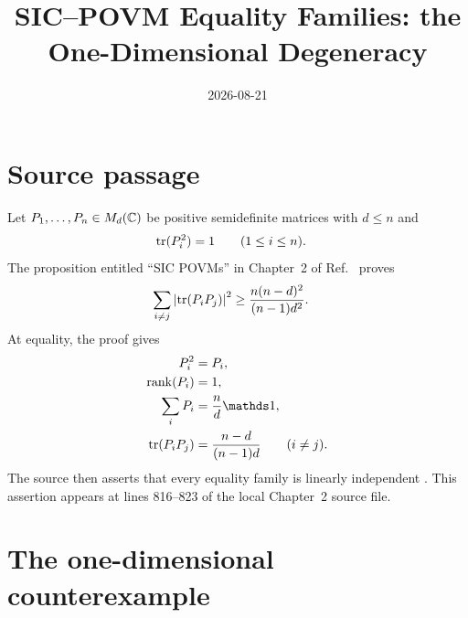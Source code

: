 \documentclass{article}
\title{SIC--POVM Equality Families: the One-Dimensional Degeneracy}
\author{}
\date{2026-08-21}
\begin{document}
\maketitle
{}

\section{Source passage}

Let $P_1,\ldots,P_n\in M_{d}(\mathbb{C})$ be positive semidefinite matrices with $d\leq n$
and
\begin{align}
    \operatorname{tr}(P_i^2)&=1
    \qquad(1\leq i\leq n).
    \label{eq:wolf_sic_povm_linear_independence_unit_purity}
\end{align}
The proposition entitled ``SIC POVMs'' in Chapter~2 of
Ref.~\cite{Wolf2012Quantum} proves
\begin{align}
    \sum_{i\neq j}
        \left|\operatorname{tr}(P_iP_j)\right|^2
        &\geq
        \frac{n(n-d)^2}{(n-1)d^2}.
    \label{eq:wolf_sic_povm_linear_independence_overlap_bound}
\end{align}
At equality, the proof gives
\begin{align}
    P_i^2&=P_i,
    \label{eq:wolf_sic_povm_linear_independence_projector}\\
    \operatorname{rank}(P_i)&=1,
    \label{eq:wolf_sic_povm_linear_independence_rank_one}\\
    \sum_iP_i&=\frac{n}{d}\Id,
    \label{eq:wolf_sic_povm_linear_independence_tight_sum}\\
    \tr(P_iP_j)
        &=\frac{n-d}{(n-1)d}
        \qquad(i\neq j).
    \label{eq:wolf_sic_povm_linear_independence_constant_overlap}
\end{align}
The source then asserts that every equality family is linearly independent
\cite{Wolf2012Quantum}. This assertion appears at lines 816--823 of the local
Chapter~2 source file.

\section{The one-dimensional counterexample}
\end{document}
